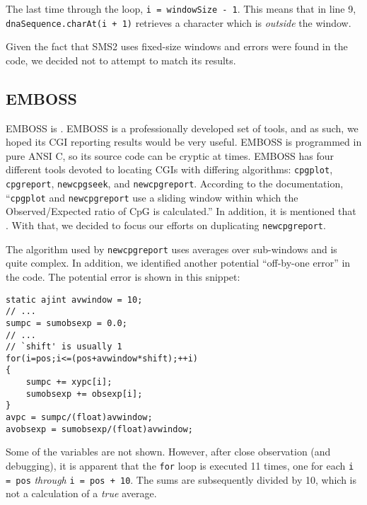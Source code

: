 \documentclass{bioinfo}
\begin{document}
The last time through the loop, \verb|i = windowSize - 1|.  This means
that in line 9, \verb|dnaSequence.charAt(i + 1)| retrieves a character
which is \emph{outside} the window.

Given the fact that SMS2 uses fixed-size windows and errors were found
in the code, we decided not to attempt to match its results.

\subsection{EMBOSS}

EMBOSS is . EMBOSS is a professionally developed set of
tools, and as such, we hoped its CGI reporting results would be very
useful. EMBOSS is programmed in pure ANSI C, so its source code can be
cryptic at times. EMBOSS has four different tools devoted to locating
CGIs with differing algorithms: \texttt{cpgplot}, \texttt{cpgreport},
\texttt{newcpgseek}, and \texttt{newcpgreport}. According to the
documentation, ``\texttt{cpgplot} and \texttt{newcpgreport} use a
sliding window within which the Observed/Expected ratio of CpG is
calculated.'' In addition, it is mentioned that
. With
that, we decided to focus our efforts on duplicating
\texttt{newcpgreport}.

The algorithm used by \texttt{newcpgreport} uses averages over
sub-windows and is quite complex. In addition, we identified another
potential ``off-by-one error'' in the code. The potential error is
shown in this snippet:

\begin{verbatim}
static ajint avwindow = 10;
// ...
sumpc = sumobsexp = 0.0;
// ...
// `shift' is usually 1
for(i=pos;i<=(pos+avwindow*shift);++i)
{
    sumpc += xypc[i];
    sumobsexp += obsexp[i];
}
avpc = sumpc/(float)avwindow;
avobsexp = sumobsexp/(float)avwindow;
\end{verbatim}

Some of the variables are not shown. However, after close observation
(and debugging), it is apparent that the \verb|for| loop is executed
11 times, one for each \verb|i = pos| \emph{through}
\verb|i = pos + 10|. The sums are subsequently divided by 10, which is
not a calculation of a \emph{true} average.
\end{document}
